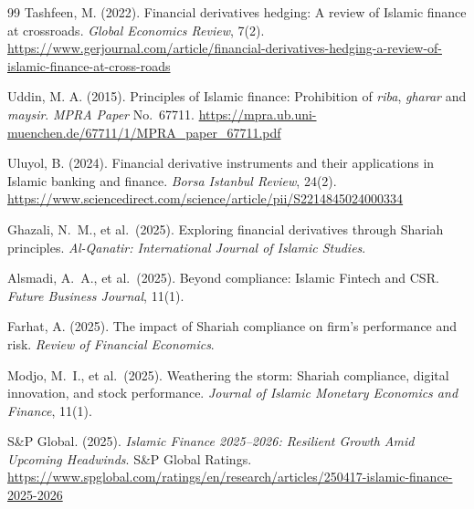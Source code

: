 \documentclass[10pt,twocolumn]{article}
\begin{document}
\begin{thebibliography}{99}
Tashfeen, M. (2022).
Financial derivatives hedging: A review of Islamic finance at crossroads.
\textit{Global Economics Review}, 7(2).
\url{https://www.gerjournal.com/article/financial-derivatives-hedging-a-review-of-islamic-finance-at-cross-roads}

Uddin, M. A. (2015).
Principles of Islamic finance: Prohibition of \textit{riba}, \textit{gharar}
and \textit{maysir}.
\textit{MPRA Paper} No.~67711.
\url{https://mpra.ub.uni-muenchen.de/67711/1/MPRA_paper_67711.pdf}

Uluyol, B. (2024).
Financial derivative instruments and their applications in Islamic banking
and finance.
\textit{Borsa Istanbul Review}, 24(2).
\url{https://www.sciencedirect.com/science/article/pii/S2214845024000334}

Ghazali, N.~M., et al.\ (2025).
Exploring financial derivatives through Shariah principles.
\textit{Al-Qanatir: International Journal of Islamic Studies}.

Alsmadi, A.~A., et al.\ (2025).
Beyond compliance: Islamic Fintech and CSR.
\textit{Future Business Journal}, 11(1).

Farhat, A. (2025).
The impact of Shariah compliance on firm's performance and risk.
\textit{Review of Financial Economics}.

Modjo, M.~I., et al.\ (2025).
Weathering the storm: Shariah compliance, digital innovation, and stock
performance.
\textit{Journal of Islamic Monetary Economics and Finance}, 11(1).

S\&P Global. (2025).
\textit{Islamic Finance 2025--2026: Resilient Growth Amid Upcoming Headwinds}.
S\&P Global Ratings.
\url{https://www.spglobal.com/ratings/en/research/articles/250417-islamic-finance-2025-2026}

\end{thebibliography}
\end{document}
